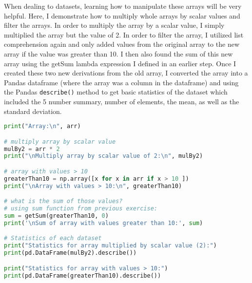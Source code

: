 \documentclass[journal]{IEEEtran}
\begin{document}
When dealing to datasets, learning how to manipulate these arrays will be very helpful. Here, I demonstrate how to multiply whole arrays by scalar values and filter the arrays. In order to multiply the array by a scalar value, I simply multiplied the array but the value of 2. In order to filter the array, I utilized list comprehension again and only added values from the original array to the new array if the value was greater than 10. I then also found the sum of this new array using the getSum lambda expression I defined in an earlier step. Once I created these two new derivations from the old array, I converted the array into a Pandas dataframe (where the array was a column in the dataframe) and using the Pandas \lstinline{describe()} method to get basic statistics of the dataset which included the 5 number summary, number of elements, the mean, as well as the standard deviation.  
\begin{lstlisting}[language=Python, caption=NumPy Array Manipulation]
print("Array:\n", arr)

# multiply array by scalar value 
mulBy2 = arr * 2
print("\nMultiply array by scalar value of 2:\n", mulBy2)

# array with values > 10 
greaterThan10 = np.array([x for x in arr if x > 10 ])
print("\nArray with values > 10:\n", greaterThan10) 

# what is the sum of those values? 
# using sum function from previous exercise: 
sum = getSum(greaterThan10, 0)
print('\nSum of array with values greater than 10:', sum)

# Statistics of each dataset
print("Statistics for array multiplied by scalar value (2):")
print(pd.DataFrame(mulBy2).describe())

print("Statistics for array with values > 10:")
print(pd.DataFrame(greaterThan10).describe())
\end{lstlisting}
\end{document}
